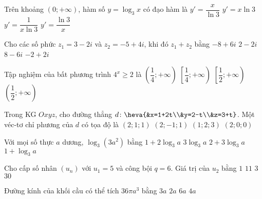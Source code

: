 \begin{ex}%
	Trên khoảng $(0;+\infty)$, hàm số $y=\log_3x$ có đạo hàm là
	\choice
	{$y'=\dfrac{x}{\ln3}$}
	{$y'=x\ln3$}
	{\True$y'=\dfrac{1}{x\ln3}$}
	{$y'=\dfrac{\ln3}{x}$}
\end{ex}

\begin{ex}%
	Cho các số phức $z_1=3-2i$ và $z_2=-5+4i$, khi đó $z_1+z_2$ bằng
	\choice
	{$-8+6i$}
	{$2-2i$}
	{$8-6i$}
	{\True$-2+2i$}
\end{ex}

\begin{ex}%
	Tập nghiệm của bất phương trình $4^x \ge 2$ là
	\choice
	{$\left(\dfrac{1}{4};+\infty\right)$}
	{$\left[\dfrac{1}{4};+\infty\right)$}
	{\True$\left[\dfrac{1}{2};+\infty\right)$}
	{$\left(\dfrac{1}{2};+\infty\right)$}
	\loigiai{
		$4^x \ge 2 \Leftrightarrow 2^{2x} \ge 2 \Leftrightarrow 2x \ge 1 \Leftrightarrow x \ge \dfrac{1}{2}$.\\
		Vậy tập nghiệm của bất phương trình là $S=\left[\dfrac{1}{2};+\infty\right)$.
	}
\end{ex}

\begin{ex}%
	Trong KG $Oxyz$, cho đường thẳng $d \colon \heva{&x=1+2t\\&y=2-t\\&z=3+t}$. Một véc-tơ chỉ phương của $d$ có tọa độ là
	\choice
	{$(2;1;1)$}
	{\True$(2;-1;1)$}
	{$(1;2;3)$}
	{$(2;0;0)$}
\end{ex}

\begin{ex}%
	Với mọi số thực $a$ dương, $\log_3(3a^2)$ bằng
	\choice
	{\True$1+2\log_3a$}
	{$3\log_3a$}
	{$2+3\log_3a$}
	{$1+\log_3a$}
\end{ex}

\begin{ex}%
	Cho cấp số nhân $(u_n)$ với $u_1=5$ và công bội $q=6$. Giá trị của $u_2$ bằng
	\choice
	{$1$}
	{$11$}
	{$3$}
	{\True$30$}
\end{ex}

\begin{ex}%
	Đường kính của khối cầu có thể tích $36\pi a^3$ bằng
	\choice
	{$3a$}
	{$2a$}
	{\True $6a$}
	{$4a$}
\end{ex}

